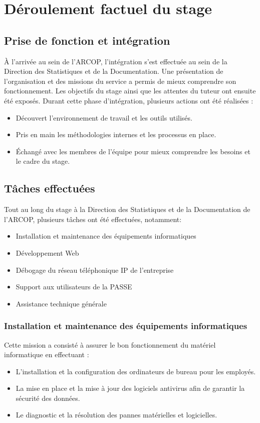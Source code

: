 \chapter{Déroulement factuel du stage}
\clearpage


\section{Prise de fonction et intégration}
À l'arrivée au sein de l'\ac{ARCOP}, l'intégration s'est effectuée au sein de la Direction des Statistiques et de la Documentation. Une présentation de l'organisation et des missions du service a permis de mieux comprendre son fonctionnement. Les objectifs du stage ainsi que les attentes du tuteur ont ensuite été exposés.
Durant cette phase d'intégration, plusieurs actions ont été réalisées :

\begin{itemize}
    \item Découvert l'environnement de travail et les outils utilisés.
    \item Pris en main les méthodologies internes et les processus en place.
    \item Échangé avec les membres de l'équipe pour mieux comprendre les besoins et le cadre du stage.

\end{itemize}
\section{Tâches effectuées}
Tout au long du stage à la Direction des Statistiques et de la Documentation de l'\ac{ARCOP}, plusieurs tâches ont été effectuées, notamment:
\begin{itemize}
    \item Installation et maintenance des équipements informatiques
    \item Développement Web
    \item Débogage du réseau téléphonique IP de l'entreprise 
    \item Support aux utilisateurs de la \ac{PASSE}
    \item Assistance technique générale    
\end{itemize} 
\subsection{Installation et maintenance des équipements informatiques}
Cette mission a consisté à assurer le bon fonctionnement du matériel informatique en effectuant :
\begin{itemize}
    \item L’installation et la configuration des ordinateurs de bureau pour les employés.

    \item La mise en place et la mise à jour des logiciels antivirus afin de garantir la sécurité des données.
    \item Le diagnostic et la résolution des pannes matérielles et logicielles.
\end{itemize}
